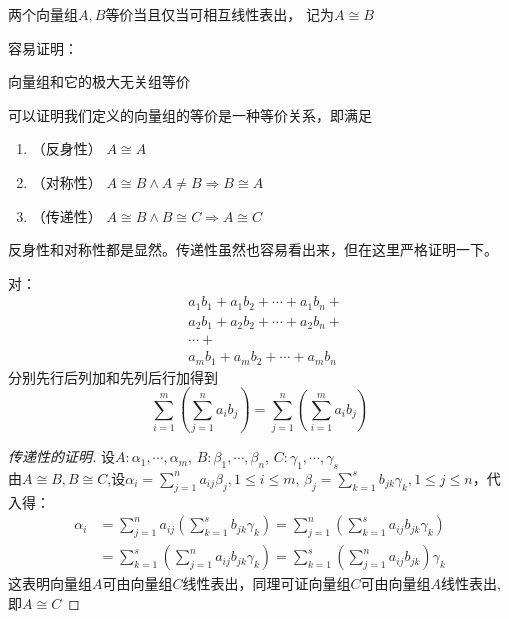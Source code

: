 \begin{definition}[向量组等价]
    两个向量组$A,B$等价当且仅当可相互线性表出， 记为$A \cong B$
\end{definition}

容易证明：
\begin{theorem}
    向量组和它的极大无关组等价
\end{theorem}

可以证明我们定义的向量组的等价是一种等价关系，即满足
\begin{enumerate}
    \item （反身性） $A \cong A$
    \item （对称性） $A \cong B \wedge A \neq B \Rightarrow B \cong A$
    \item （传递性） $A \cong B \wedge B \cong C \Rightarrow A \cong C$
\end{enumerate}

反身性和对称性都是显然。传递性虽然也容易看出来，但在这里严格证明一下。
\begin{lemma}[双重连加号的可交换性]
    对：
    \begin{align*}
        &a_1b_1 + a_1b_2 + \cdots + a_1b_n +\\
        &a_2b_1 + a_2b_2 + \cdots + a_2b_n +\\
        & \cdots + \\
        &a_mb_1 + a_mb_2 + \cdots + a_mb_n 
    \end{align*}
    分别先行后列加和先列后行加得到
    \begin{equation*}
        \sum_{i=1}^{m}\left( \sum_{j=1}^{n}a_ib_j \right) = \sum_{j=1}^{n}\left( \sum_{i=1}^{m}a_ib_j \right)
    \end{equation*}
\end{lemma}

\begin{proof}[传递性的证明]
    设$A:\alpha_1, \cdots, \alpha_m$, $B:\beta_1, \cdots, \beta_n$, $C:\gamma_1, \cdots, \gamma_s$\\
    由$A \cong B, B \cong C$,设$\alpha_i = \sum_{j=1}^{n}a_{ij}\beta_j, 1 \leq i \leq m$, $\beta_j = \sum_{k=1}^{s}b_{jk}\gamma_k, 1 \leq j \leq n$，代入得：
    \begin{align*}
        \alpha_i &= \sum_{j=1}^{n}a_{ij}\left( \sum_{k=1}^{s}b_{jk}\gamma_k \right) = \sum_{j=1}^{n}\left( \sum_{k=1}^{s}a_{ij}b_{jk}\gamma_k \right)\\
                 &= \sum_{k=1}^{s}\left( \sum_{j=1}^{n}a_{ij}b_{jk}\gamma_k \right) = \sum_{k=1}^{s}\left( \sum_{j=1}^{n}a_{ij}b_{jk} \right)\gamma_k
    \end{align*}
    这表明向量组$A$可由向量组$C$线性表出，同理可证向量组$C$可由向量组$A$线性表出,即$A \cong C$
\end{proof}

